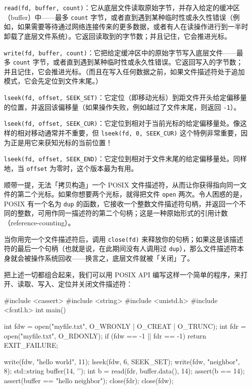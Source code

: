 \texttt{read(\allowbreak{}fd,\allowbreak{} buffer,\allowbreak{} count)\allowbreak{}}：它从底层文件读取原始字节，并存入给定的缓冲区（buffer）中——最多 \texttt{count} 字节，或者直到遇到某种临时性或永久性错误（例如，如果需要等待通过网络连接传来的更多数据，或者有人在读操作进行到一半时卸载了底层文件系统）。它返回读取到的字节数；并且记住，它会推进光标。

\texttt{write(\allowbreak{}fd,\allowbreak{} buffer,\allowbreak{} count)\allowbreak{}}：它把给定缓冲区中的原始字节写入底层文件——最多 \texttt{count} 字节，或者直到遇到某种临时性或永久性错误。它返回写入的字节数；并且记住，它会推进光标。（而且在写入任何数据之前，如果文件描述符处于追加模式，它会先定位到文件末尾。）

\texttt{lseek(\allowbreak{}fd,\allowbreak{} offset,\allowbreak{} SEEK\_\allowbreak{}SET)\allowbreak{}}：它定位（即移动光标）到距文件开头给定偏移量的位置，并返回该偏移量（如果操作失败，例如越过了文件末尾，则返回 \texttt{-1}）。

\texttt{lseek(\allowbreak{}fd,\allowbreak{} offset,\allowbreak{} SEEK\_\allowbreak{}CUR)\allowbreak{}}：它定位到相对于当前光标的给定偏移量处。像这样的相对移动通常并不重要，但 \texttt{lseek(\allowbreak{}fd,\allowbreak{} 0,\allowbreak{} SEEK\_\allowbreak{}CUR)\allowbreak{}} 这个特例非常重要，因为正是用它来获知光标的当前位置！

\texttt{lseek(\allowbreak{}fd,\allowbreak{} offset,\allowbreak{} SEEK\_\allowbreak{}END)\allowbreak{}}：它定位到相对于文件末尾的给定偏移量处。同样地，当 \texttt{offset} 为零时，这个版本最为有用。

顺带一提，无法「拷贝构造」一个 POSIX 文件描述符，从而让你获得指向同一文件的第二个光标。如果你想要两个光标，就得把文件 \texttt{open} 两次。令人困惑的是，POSIX 有一个名为 \texttt{dup} 的函数，它接收一个整数文件描述符句柄，并返回一个不同的整数，可用作同一描述符的第二个句柄；这是一种原始形式的引用计数（reference-counting）。

当你用完一个文件描述符后，调用 \texttt{close(\allowbreak{}fd)\allowbreak{}} 来释放你的句柄；如果这是该描述符的最后一个句柄（也就是说，在此期间没有人调用过 \texttt{dup}），那么文件描述符本身就会被操作系统回收——换言之，底层文件就被「关闭」了。

把上述一切都组合起来，我们可以用 POSIX API 编写这样一个简单的程序，来打开、读取、写入、定位并关闭文件描述符：

\begin{codebox}[cpp]
    #include <cassert>
    #include <string>
    #include <unistd.h>
    #include <fcntl.h>
    int main()
    {
      int fdw = open("myfile.txt", O_WRONLY | O_CREAT | O_TRUNC);
      int fdr = open("myfile.txt", O_RDONLY);
      if (fdw == -1 || fdr == -1)
        return EXIT_FAILURE;

      write(fdw, "hello world", 11);
      lseek(fdw, 6, SEEK_SET);
      write(fdw, "neighbor", 8);
      std::string buffer(14, '\0');
      int b = read(fdr, buffer.data(), 14);
      assert(b == 14);
      assert(buffer == "hello neighbor");
      close(fdr);
      close(fdw);
    }
\end{codebox}

